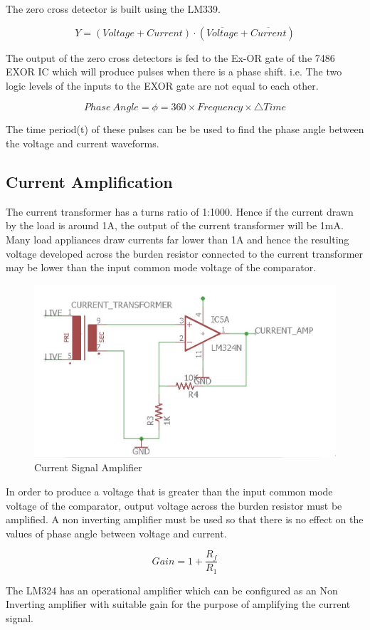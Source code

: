 {The zero cross detector is built using the LM339. 

\begin{equation}
    Y = (Voltage + Current) \cdot (\overline{Voltage}+\overline{Current})
\end{equation}

The output of the zero cross detectors is fed to the Ex-OR gate of the 7486 EXOR IC which will produce pulses when there is a phase shift. i.e. The two logic levels of the inputs to the EXOR gate are not equal to each other. 

\begin{equation}
    Phase\ Angle = \phi=360\times Frequency\times \triangle Time
\end{equation}

The time period(t) of these pulses can be be used to find the phase angle between the voltage and current waveforms.

\subsection{Current Amplification}
The current transformer has a turns ratio of 1:1000. Hence if the current drawn by the load is around 1A, the output of the current transformer will be 1mA. Many load appliances draw currents far lower than 1A and hence the resulting voltage developed across the burden resistor connected to the current transformer may be lower than the input common mode voltage of the comparator. 


\begin{figure}[H]
	    \includegraphics[scale=0.70]{images/iamp.jpg}
	    \centering
	    \caption{Current Signal Amplifier}
	    \label{iamp}
	\end{figure}


In order to produce a voltage that is greater than the input common mode voltage of the comparator, output voltage across the burden resistor must be amplified. A non inverting amplifier must be used so that there is no effect on the values of phase angle between voltage and current.

\begin{equation}
Gain = 1+ \frac{R_{f}}{R_{1}} 
\end{equation}

The LM324 has an operational amplifier which can be configured as an Non Inverting amplifier with suitable gain for the purpose of amplifying the current signal. 
}
